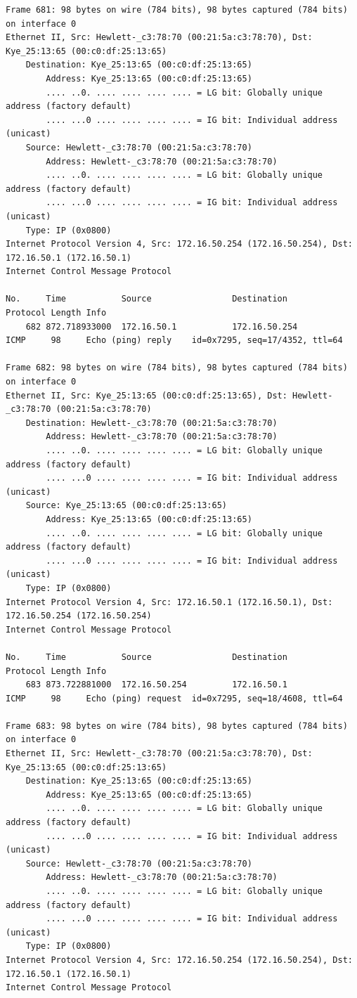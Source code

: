 \documentclass[a4paper,11pt]{article}
\begin{document}
\begin{lstlisting}
Frame 681: 98 bytes on wire (784 bits), 98 bytes captured (784 bits) on interface 0
Ethernet II, Src: Hewlett-_c3:78:70 (00:21:5a:c3:78:70), Dst: Kye_25:13:65 (00:c0:df:25:13:65)
    Destination: Kye_25:13:65 (00:c0:df:25:13:65)
        Address: Kye_25:13:65 (00:c0:df:25:13:65)
        .... ..0. .... .... .... .... = LG bit: Globally unique address (factory default)
        .... ...0 .... .... .... .... = IG bit: Individual address (unicast)
    Source: Hewlett-_c3:78:70 (00:21:5a:c3:78:70)
        Address: Hewlett-_c3:78:70 (00:21:5a:c3:78:70)
        .... ..0. .... .... .... .... = LG bit: Globally unique address (factory default)
        .... ...0 .... .... .... .... = IG bit: Individual address (unicast)
    Type: IP (0x0800)
Internet Protocol Version 4, Src: 172.16.50.254 (172.16.50.254), Dst: 172.16.50.1 (172.16.50.1)
Internet Control Message Protocol

No.     Time           Source                Destination           Protocol Length Info
    682 872.718933000  172.16.50.1           172.16.50.254         ICMP     98     Echo (ping) reply    id=0x7295, seq=17/4352, ttl=64

Frame 682: 98 bytes on wire (784 bits), 98 bytes captured (784 bits) on interface 0
Ethernet II, Src: Kye_25:13:65 (00:c0:df:25:13:65), Dst: Hewlett-_c3:78:70 (00:21:5a:c3:78:70)
    Destination: Hewlett-_c3:78:70 (00:21:5a:c3:78:70)
        Address: Hewlett-_c3:78:70 (00:21:5a:c3:78:70)
        .... ..0. .... .... .... .... = LG bit: Globally unique address (factory default)
        .... ...0 .... .... .... .... = IG bit: Individual address (unicast)
    Source: Kye_25:13:65 (00:c0:df:25:13:65)
        Address: Kye_25:13:65 (00:c0:df:25:13:65)
        .... ..0. .... .... .... .... = LG bit: Globally unique address (factory default)
        .... ...0 .... .... .... .... = IG bit: Individual address (unicast)
    Type: IP (0x0800)
Internet Protocol Version 4, Src: 172.16.50.1 (172.16.50.1), Dst: 172.16.50.254 (172.16.50.254)
Internet Control Message Protocol

No.     Time           Source                Destination           Protocol Length Info
    683 873.722881000  172.16.50.254         172.16.50.1           ICMP     98     Echo (ping) request  id=0x7295, seq=18/4608, ttl=64

Frame 683: 98 bytes on wire (784 bits), 98 bytes captured (784 bits) on interface 0
Ethernet II, Src: Hewlett-_c3:78:70 (00:21:5a:c3:78:70), Dst: Kye_25:13:65 (00:c0:df:25:13:65)
    Destination: Kye_25:13:65 (00:c0:df:25:13:65)
        Address: Kye_25:13:65 (00:c0:df:25:13:65)
        .... ..0. .... .... .... .... = LG bit: Globally unique address (factory default)
        .... ...0 .... .... .... .... = IG bit: Individual address (unicast)
    Source: Hewlett-_c3:78:70 (00:21:5a:c3:78:70)
        Address: Hewlett-_c3:78:70 (00:21:5a:c3:78:70)
        .... ..0. .... .... .... .... = LG bit: Globally unique address (factory default)
        .... ...0 .... .... .... .... = IG bit: Individual address (unicast)
    Type: IP (0x0800)
Internet Protocol Version 4, Src: 172.16.50.254 (172.16.50.254), Dst: 172.16.50.1 (172.16.50.1)
Internet Control Message Protocol


\end{lstlisting}
\end{document}
